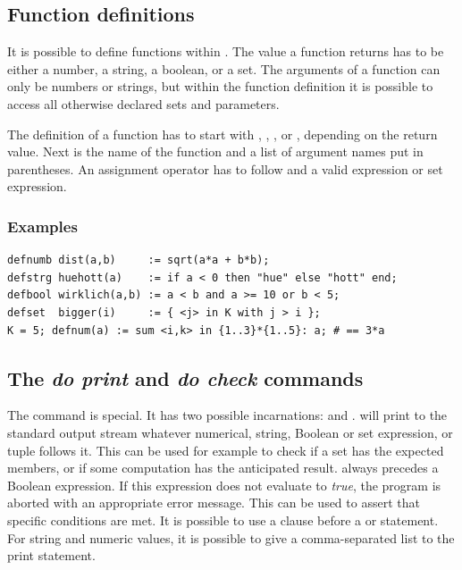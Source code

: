 \subsection{Function definitions}
It is possible to define functions within \zimpl. The value a
function returns has to be either a number, a string, a boolean, or a set.
The arguments of a function can only be numbers or strings, but within
the function definition it is possible to access all otherwise
declared sets and parameters.

The definition of a function has to start with
, , , or , depending on the
return value.
Next is the name
of the function and a list of argument names put in parentheses.
An assignment operator \code{:=} has to follow and a valid
expression or set expression.

\subsubsection{Examples}
{\small
\begin{verbatim}
defnumb dist(a,b)     := sqrt(a*a + b*b);
defstrg huehott(a)    := if a < 0 then "hue" else "hott" end;
defbool wirklich(a,b) := a < b and a >= 10 or b < 5;
defset  bigger(i)     := { <j> in K with j > i };
K = 5; defnum(a) := sum <i,k> in {1..3}*{1..5}: a; # == 3*a
\end{verbatim}
}


\subsection{The \emph{do print} and \emph{do check} commands}
The  command is special.
It has two possible incarnations:
 and .  will print to the
standard output stream
whatever numerical, string, Boolean or set expression, or tuple
follows it. This can be used for example to check if a set has the
expected members, or if some computation has the anticipated result.
 always precedes a Boolean expression. If this
expression does not evaluate to \emph{true}, the program is aborted
with an appropriate error message. This can be used to assert that
specific conditions are met.
It is possible to use a  clause before a 
or  statement.
For string and numeric values, it is possible to give a comma-separated
list to the print statement.

